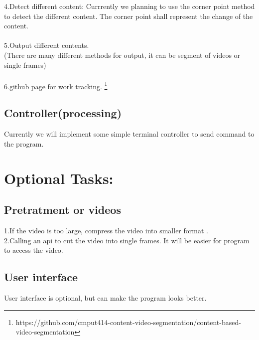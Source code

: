 \documentclass[11pt]{article} %
\begin{document}
4.Detect different content: Currrently we planning to use the corner point method to detect the different content. The corner point shall represent the change of the content.\\\\
5.Output different contents. \\
(There are many different methods for output, it can be segment of videos or single frames)\\\\
6.github page for work tracking.
\footnote{https://github.com/cmput414-content-video-segmentation/content-based-video-segmentation}
\subsection{Controller(processing)}
Currently we will implement some simple terminal controller to send command to the program.


\section{Optional Tasks:}
\subsection{Pretratment or videos}
1.If the video is too large, compress the video into smaller format .\\
2.Calling an api to cut the video into single frames. It will be easier for program to access the video.

\subsection{User interface}
User interface is optional, but can make the program looks better.
\end{document}
